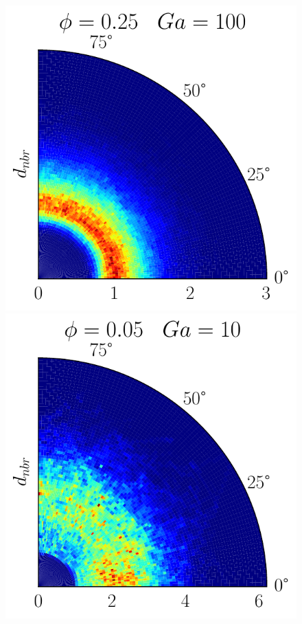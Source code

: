 \begin{figure}[h!]
    \includegraphics[height =\size]{image/N_10/beta/2DMAP_theta_distmin_dmin_10_Bo1PHI0_25mu_r0_42Ga100.pdf}
    \includegraphics[height =\size]{image/N_10/beta/2DMAP_theta_distmin_dmin_10_Bo1PHI0_05mu_r0_042Ga10.pdf}

\end{figure}
